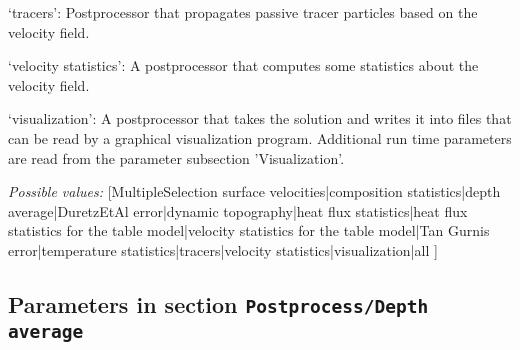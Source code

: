 \begin{itemize}
`tracers': Postprocessor that propagates passive tracer particles based on the velocity field.

`velocity statistics': A postprocessor that computes some statistics about the velocity field.

`visualization': A postprocessor that takes the solution and writes it into files that can be read by a graphical visualization program. Additional run time parameters are read from the parameter subsection 'Visualization'.


{\it Possible values:} [MultipleSelection surface velocities|composition statistics|depth average|DuretzEtAl error|dynamic topography|heat flux statistics|heat flux statistics for the table model|velocity statistics for the table model|Tan Gurnis error|temperature statistics|tracers|velocity statistics|visualization|all ]
\end{itemize}



\subsection{Parameters in section \tt Postprocess/Depth average}
\label{parameters:Postprocess/Depth_20average}

